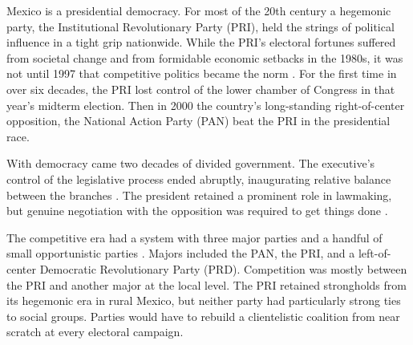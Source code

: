 \documentclass[letter,12pt]{article}
\begin{document}


Mexico is a presidential democracy. For most of the 20th century a hegemonic party, the Institutional Revolutionary Party (PRI), held the strings of political influence in a tight grip nationwide. While the PRI's electoral fortunes suffered from societal change and from formidable economic setbacks in the 1980s, it was not until 1997 that competitive politics became the norm \citep{scott.1959,cosio.villegas.1981,molinar.1991a,cornelius.1996}. For the first time in over six decades, the PRI lost control of the lower chamber of Congress in that year's midterm election. Then in 2000 the country's long-standing right-of-center opposition, the National Action Party (PAN) beat the PRI in the presidential race.  

With democracy came two decades of divided government. The executive's control of the legislative process ended abruptly, inaugurating relative balance between the branches \citep{weldon.1997,lujambioMichel.reglamentos.2012}. The president retained a prominent role in lawmaking, but genuine negotiation with the opposition was required to get things done \citep{casarSinMay2013,bejarQuienLegisla2012}. 

The competitive era had a system with three major parties and a handful of small opportunistic parties \citep[see][]{moreno.decisElec.2009,diaz-estevez-magaloni-Poverty-book.2016}. Majors included the PAN, the PRI, and a left-of-center Democratic Revolutionary Party (PRD). Competition was mostly between the PRI and another major at the local level. The PRI retained strongholds from its hegemonic era in rural Mexico, but neither party had particularly strong ties to social groups. Parties would have to rebuild a clientelistic coalition from near scratch at every electoral campaign.
\end{document}
